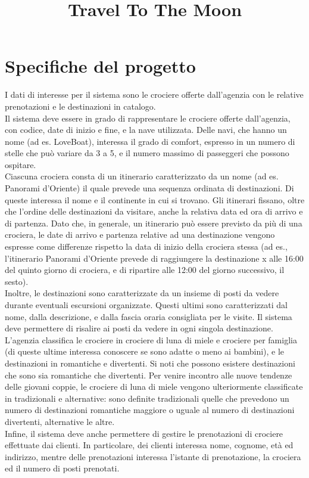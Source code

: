\documentclass{article}
\title{Travel To The Moon}
\author{}
\date{}
\begin{document}
\maketitle

\section{Specifiche del progetto}

I dati di interesse per il sistema sono le crociere offerte dall'agenzia con le relative prenotazioni e le destinazioni in catalogo.
\\
Il sistema deve essere in grado di rappresentare le crociere offerte dall'agenzia, con codice, date di inizio e fine, e la nave utilizzata. Delle navi, che hanno un nome (ad es. LoveBoat), interessa il grado di comfort, espresso in un numero di stelle che può variare da 3 a 5, e il numero massimo di passeggeri che possono ospitare.
\\
Ciascuna crociera consta di un itinerario caratterizzato da un nome (ad es. Panorami d'Oriente) il quale prevede una sequenza ordinata di destinazioni. Di queste interessa il nome e il continente in cui si trovano. Gli itinerari fissano, oltre che l'ordine delle destinazioni da visitare, anche la relativa data ed ora di arrivo e di partenza. Dato che, in generale, un itinerario può essere previsto da più di una crociera, le date di arrivo e partenza relative ad una destinazione vengono espresse come differenze rispetto la data di inizio della crociera stessa (ad es., l'itinerario Panorami d'Oriente prevede di raggiungere la destinazione x alle 16:00 del quinto giorno di crociera, e di ripartire alle 12:00 del giorno successivo, il sesto).
\\
Inoltre, le destinazioni sono caratterizzate da un insieme di posti da vedere durante eventuali escursioni organizzate. Questi ultimi sono caratterizzati dal nome, dalla descrizione, e dalla fascia oraria consigliata per le visite. Il sistema deve permettere di risalire ai posti da vedere in ogni singola destinazione.
\\
L'agenzia classifica le crociere in crociere di luna di miele e crociere per famiglia (di queste ultime interessa conoscere se sono adatte o meno ai bambini), e le destinazioni in romantiche e divertenti. Si noti che possono esistere destinazioni che sono sia romantiche che divertenti. Per venire incontro alle nuove tendenze delle giovani coppie, le crociere di luna di miele vengono ulteriormente classificate in tradizionali e alternative: sono definite tradizionali quelle che prevedono un numero di destinazioni romantiche maggiore o uguale al numero di destinazioni divertenti, alternative le altre.
\\
Infine, il sistema deve anche permettere di gestire le prenotazioni di crociere effettuate dai clienti. In particolare, dei clienti interessa nome, cognome, età ed indirizzo, mentre delle prenotazioni interessa l'istante di prenotazione, la crociera ed il numero di posti prenotati.
\\
\end{document}
